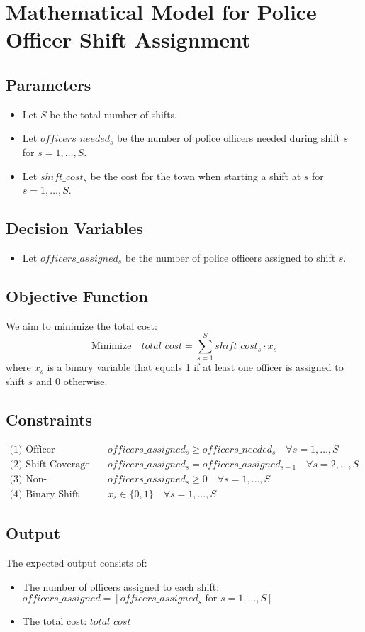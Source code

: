 \documentclass{article}
\begin{document}
\section*{Mathematical Model for Police Officer Shift Assignment}

\subsection*{Parameters}
\begin{itemize}
    \item Let \( S \) be the total number of shifts.
    \item Let \( officers\_needed_s \) be the number of police officers needed during shift \( s \) for \( s = 1, \ldots, S \).
    \item Let \( shift\_cost_s \) be the cost for the town when starting a shift at \( s \) for \( s = 1, \ldots, S \).
\end{itemize}

\subsection*{Decision Variables}
\begin{itemize}
    \item Let \( officers\_assigned_s \) be the number of police officers assigned to shift \( s \).
\end{itemize}

\subsection*{Objective Function}
We aim to minimize the total cost:
\[
\text{Minimize} \quad total\_cost = \sum_{s=1}^{S} shift\_cost_s \cdot x_s
\]
where \( x_s \) is a binary variable that equals 1 if at least one officer is assigned to shift \( s \) and 0 otherwise.

\subsection*{Constraints}
\begin{align}
    \text{(1) Officer Assignment Constraint:} & \quad officers\_assigned_s \geq officers\_needed_s \quad \forall s = 1, \ldots, S \\
    \text{(2) Shift Coverage Constraint:} & \quad officers\_assigned_s = officers\_assigned_{s-1} \quad \forall s = 2, \ldots, S \\
    \text{(3) Non-negativity:} & \quad officers\_assigned_s \geq 0 \quad \forall s = 1, \ldots, S \\
    \text{(4) Binary Shift Indicator:} & \quad x_s \in \{0, 1\} \quad \forall s = 1, \ldots, S
\end{align}

\subsection*{Output}
The expected output consists of:
\begin{itemize}
    \item The number of officers assigned to each shift: \( officers\_assigned = [officers\_assigned_s \text{ for } s = 1, \ldots, S] \)
    \item The total cost: \( total\_cost \)
\end{itemize}
\end{document}
